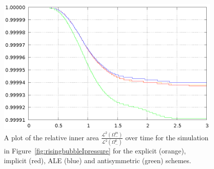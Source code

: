 \documentclass[a4paper,12pt,onecolumn]{article}
\begin{document}
\begin{figure}[htbp]
\centering
\includegraphics[width=.45\textwidth]
{figures/rising_bubble_I_inner_volume.ps}
\caption[Navier--Stokes rising bubble I inner area]
{A plot of the relative inner area
$\frac{\mathcal{L}^2(\Omega^m_-)}{\mathcal{L}^2(\Omega^0_-)}$ over time for the
simulation in Figure~\ref{fig:risingbubbleIpressure} for the explicit
(orange), implicit (red), ALE (blue) and antisymmetric (green) schemes.}
\label{fig:risingbubbleIinnervolume}
\end{figure}
\end{document}
